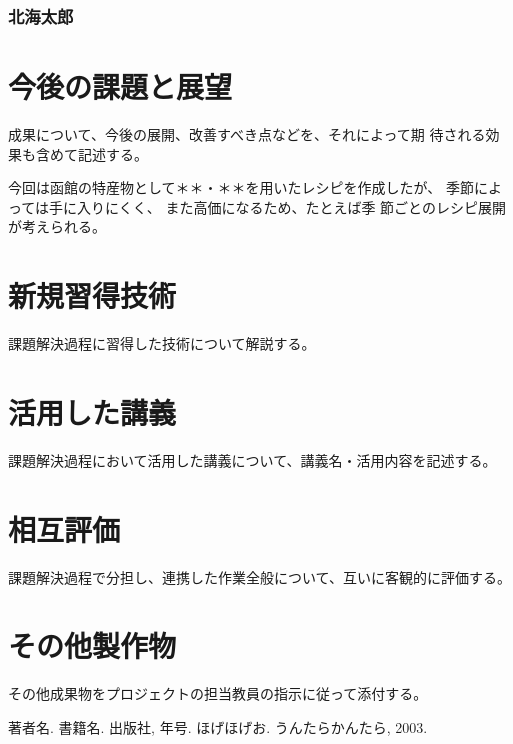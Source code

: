 \documentclass[openany,11pt,papersize]{jsbook}
\begin{document}

\subsection{北海太郎}




\chapter{今後の課題と展望}
\begin{hissu}
成果について、今後の展開、改善すべき点などを、それによって期
待される効果も含めて記述する。
\end{hissu}

今回は函館の特産物として＊＊・＊＊を用いたレシピを作成したが、
季節によっては手に入りにくく、 また高価になるため、たとえば季
節ごとのレシピ展開が考えられる。 


\begin{appendix}

\chapter{新規習得技術}
\begin{hissu}
課題解決過程に習得した技術について解説する。
\end{hissu}

\chapter{活用した講義}
\begin{hissu}
課題解決過程において活用した講義について、講義名・活用内容を記述する。 
\end{hissu}

\chapter{相互評価}
\begin{hissu}
課題解決過程で分担し、連携した作業全般について、互いに客観的に評価する。 
\end{hissu}

\chapter{その他製作物}
\begin{hissu}
その他成果物をプロジェクトの担当教員の指示に従って添付する。
\end{hissu}

\end{appendix}



\begin{thebibliography}{9}
  著者名. 書籍名. 出版社,  年号.
  ほげほげお. うんたらかんたら,  2003.
\end{thebibliography}
\end{document}
